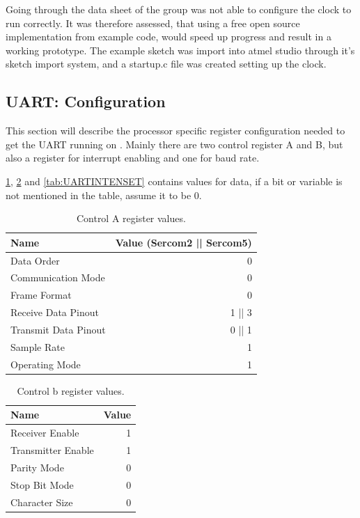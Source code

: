 Going through the data sheet of \SAMD the group was not able to configure the clock to run correctly. It was therefore assessed, that using a free open source implementation from example code\cite{MKR1400GIT}, would speed up progress and result in a working prototype. The example sketch was import into atmel studio through it's sketch import system, and a startup.c file was created setting up the clock.

\subsection{UART: Configuration}
This section will describe the processor specific register configuration needed to get the UART running on \SAMD. Mainly there are two control register A and B, but also a register for interrupt enabling and one for baud rate.

\cref{tab:UARTControlA}, \cref{tab:UARTControlB} and \cref{tab:UARTINTENSET} contains values for data, if a bit or variable is not mentioned in the table, assume it to be 0.

\begin{table}[H]
	\begin{tabular}{lr}
		\toprule
		Name & Value (Sercom2 || Sercom5) \\
		\midrule
		Data Order & 0 \\ 
		Communication Mode & 0 \\ 
		Frame Format & 0 \\ 
		Receive Data Pinout & 1 || 3 \\ 
		Transmit Data Pinout & 0 || 1 \\ 
		Sample Rate & 1 \\ 
		Operating Mode & 1 \\ 
		\bottomrule
	\end{tabular} 
	\centering
	\caption{Control A register values.}
	\label{tab:UARTControlA}
\end{table}

\begin{table}[H]
	\begin{tabular}{lr}
		\toprule
		Name & Value \\
		\midrule
		Receiver Enable & 1 \\ 
		Transmitter Enable & 1 \\ 
		Parity Mode & 0 \\ 
		Stop Bit Mode & 0 \\ 
		Character Size & 0 \\ 
		\bottomrule
	\end{tabular} 
	\centering
	\caption{Control b register values.}
	\label{tab:UARTControlB}
\end{table}

